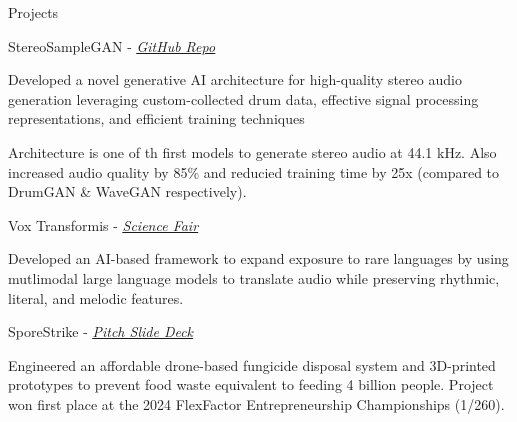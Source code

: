 \documentclass[
  10pt, %
]{resume}
\begin{document}

\begin{rSection}{Projects}

  
    \begin{rSubsection}{StereoSampleGAN - \textit{\underline{\href{https://github.com/shuklabhay/stereo-sample-gan}{GitHub Repo}}}}{}{}{}
        
      \item Developed a novel generative AI architecture for high-quality stereo audio generation leveraging custom-collected drum data, effective signal processing representations, and efficient training techniques
          
      \item Architecture is one of th first models to generate stereo audio at 44.1 kHz. Also increased audio quality by 85\% and reducied training time by 25x (compared to DrumGAN \& WaveGAN respectively).
          
    \end{rSubsection}
        
    \begin{rSubsection}{Vox Transformis - \textit{\underline{\href{https://science-fair.org/}{Science Fair}}}}{}{}{}
        
      \item Developed an AI-based framework to expand exposure to rare languages by using mutlimodal large language models to translate audio while preserving rhythmic, literal, and melodic features.
          
    \end{rSubsection}
        
    \begin{rSubsection}{SporeStrike - \textit{\underline{\href{https://shuklabhay.github.io/static/projects/sporestrike/FlexFactor_SporeStrike_pitch.pdf}{Pitch Slide Deck}}}}{}{}{}
        
      \item Engineered an affordable drone-based fungicide disposal system and 3D-printed prototypes to prevent food waste equivalent to feeding 4 billion people. Project won first place at the 2024 FlexFactor Entrepreneurship Championships (1/260).
          
    \end{rSubsection}
        

\end{rSection}
    
\end{document}
